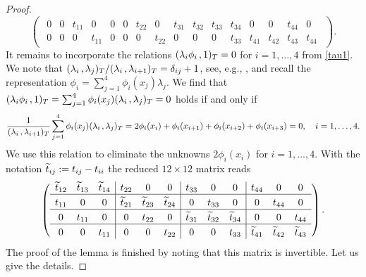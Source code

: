 \documentclass[11pt]{article}
\begin{document}
\begin{proof}
\[\begin{pmatrix}
\begin{array}{cccc|cccc|cccc|cccc}
      0 & 0 & t_{11} & 0 & 0 & 0 & t_{22} & 0 & t_{31} & t_{32} & t_{33} & t_{34} & 0 & 0 & t_{44} & 0 \\\hline
      0 & 0 & 0 & t_{11} & 0 & 0 & 0 & t_{22} & 0 & 0 & 0 & t_{33} & t_{41} & t_{42} & t_{43} & t_{44}
   \end{array}
   \end{pmatrix}.
\]
It remains to incorporate the relations
$(\lambda_i\phi_i\hspace*{.5mm},1)_T=0$ for $i=1,\ldots,4$ from \eqref{tau1}.
We note that
$(\lambda_i\hspace*{.5mm},\lambda_j)_T/(\lambda_i\hspace*{.5mm},\lambda_{i+1})_T=\delta_{ij}+1$,
see, e.g., \cite[Theorem~3.1]{VermolenS_18_IRP},
and recall the representation $\phi_i=\sum_{j=1}^4 \phi_i(x_j)\lambda_j$.
We find that
\(
   (\lambda_i\phi_i\hspace*{.5mm},1)_T = \sum_{j=1}^4 \phi_i(x_j) (\lambda_i\hspace*{.5mm},\lambda_j)_T=0
\)
holds if and only if
\[
   \frac 1{(\lambda_i\hspace*{.5mm},\lambda_{i+1})_T}
   \sum_{j=1}^4 \phi_i(x_j) (\lambda_i\hspace*{.5mm},\lambda_j)_T
   =
   2\phi_i(x_i) + \phi_i(x_{i+1}) + \phi_i(x_{i+2}) + \phi_i(x_{i+3}) = 0,
   \quad i=1,\ldots,4.
\]
We use this relation to eliminate the unknowns $2\phi_i(x_i)$ for $i=1,\ldots,4$.
With the notation
$\widetilde t_{ij}:=t_{ij}-t_{ii}$ the reduced $12\times 12$ matrix reads
\def\mm{\!\!-\!\!}
\newcommand\Tstrut{\rule{0pt}{2.6ex}} %
\begin{equation} \label{mat_red}
\begin{pmatrix}
\begin{array}{ccc|ccc|ccc|ccc}
  \wtt_{12}& \wtt_{13}& \wtt_{14}& t_{22} & 0 & 0 & t_{33} & 0 & 0 & t_{44} & 0 & 0 \\\hline
\Tstrut
  t_{11} & 0 & 0 & \wtt_{21}& \wtt_{23}& \wtt_{24}& 0 & t_{33} & 0 & 0 & t_{44} & 0 \\\hline
\Tstrut
  0 & t_{11} & 0 & 0 & t_{22} & 0 & \wtt_{31}& \wtt_{32}& \wtt_{34}& 0 & 0 & t_{44} \\\hline
\Tstrut
  0 & 0 & t_{11} & 0 & 0 & t_{22} & 0 & 0 & t_{33} & \wtt_{41}& \wtt_{42}& \wtt_{43}
\end{array}
\end{pmatrix}.
\end{equation}
The proof of the lemma is finished by noting that this matrix is invertible.
Let us give the details.


\end{proof}
\end{document}
